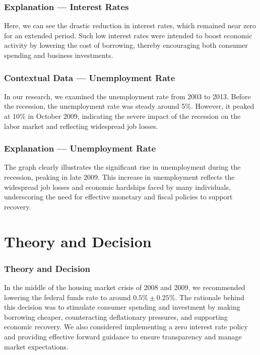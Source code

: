 \documentclass{beamer}
\begin{document}
\begin{frame}
    \frametitle{Explanation --- Interest Rates}
    Here, we can see the drastic reduction in interest rates, which remained near zero for an extended period. Such low interest rates were intended to boost economic activity by lowering the cost of borrowing, thereby encouraging both consumer spending and business investments.
\end{frame}

\begin{frame}
    \frametitle{Contextual Data --- Unemployment Rate}
    In our research, we examined the unemployment rate from 2003 to 2013. Before the recession, the unemployment rate was steady around 5\%. However, it peaked at 10\% in October 2009, indicating the severe impact of the recession on the labor market and reflecting widespread job losses.
\end{frame}

\begin{frame}
    \frametitle{Explanation --- Unemployment Rate}
    The graph clearly illustrates the significant rise in unemployment during the recession, peaking in late 2009. This increase in unemployment reflects the widespread job losses and economic hardships faced by many individuals, underscoring the need for effective monetary and fiscal policies to support recovery.
\end{frame}

\section{Theory and Decision}
\begin{frame}
    \frametitle{Theory and Decision}
    In the middle of the housing market crisis of 2008 and 2009, we recommended lowering the federal funds rate to around \(0.5\% \pm 0.25\% \). The rationale behind this decision was to stimulate consumer spending and investment by making borrowing cheaper, counteracting deflationary pressures, and supporting economic recovery. We also considered implementing a zero interest rate policy and providing effective forward guidance to ensure transparency and manage market expectations.
\end{frame}
\end{document}
